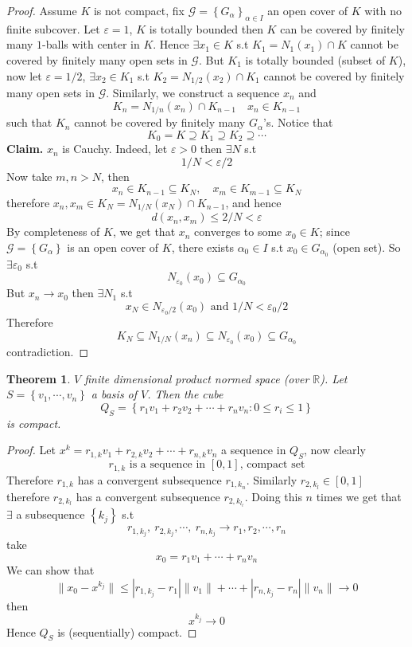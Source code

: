 \documentclass[11pt,a4paper]{article}
\theoremstyle{definition}
\theoremstyle{plain}
\newtheorem{theorem}[definition]{Theorem}
\theoremstyle{remark}
\newcommand{\R}{\mathbb{R}}
\renewcommand{\set}[1]{\left\{ #1 \right\}}
\newcommand{\norm}[1]{\lVert #1 \rVert}
\begin{document}
\begin{proof}
    Assume $K$ is not compact, fix $\mathcal{G} = \set{G_\alpha}_{\alpha \in I}$ an open cover of $K$ with no finite subcover. 
    Let $\varepsilon = 1$, $K$ is totally bounded then $K$ can be covered by finitely many $1$-balls with center in $K$. Hence $\exists x_1 \in K$ s.t 
    $K_1 = N_1 (x_1) \cap K$ cannot be covered by finitely many open sets in $\mathcal{G}$. But $K_1$ is totally bounded (subset of $K$), 
    now let $\varepsilon = 1/2$, $\exists x_2 \in K_1$ s.t $K_2 = N_{1/2} (x_2) \cap K_1$ cannot be covered by finitely many open sets in $\mathcal{G}$. 
    Similarly, we construct a sequence $x_n$ and 
    $$K_n = N_{1/n} (x_{n}) \cap K_{n-1} \quad x_n \in K_{n-1}$$
    such that $K_n$ cannot be covered by finitely many $G_\alpha$'s. Notice that 
    $$K_0 = K \supseteq K_1 \supseteq K_2 \supseteq \cdots$$
    \textbf{Claim.} $x_n$ is Cauchy. Indeed, let $\varepsilon > 0$ then $\exists N$ s.t 
    $$1/N < \varepsilon / 2$$
    Now take $m, n > N$, then 
    $$x_n \in K_{n-1} \subseteq K_N, \quad x_m \in K_{m-1} \subseteq K_N$$
    therefore $x_n, x_m \in K_N = N_{1/N} (x_N) \cap K_{n-1}$, and hence 
    $$d(x_n, x_m) \leq 2/N < \varepsilon$$
    By completeness of $K$, we get that $x_n$ converges to some $x_0 \in K$; since $\mathcal{G} = \set{G_\alpha}$ is an open cover of $K$, 
    there exists $\alpha_0 \in I$ s.t $x_0 \in G_{\alpha_0}$ (open set). So $\exists \varepsilon_0$ s.t 
    $$N_{\varepsilon_0} (x_0) \subseteq G_{\alpha_0}$$
    But $x_n \to x_0$ then $\exists N_1$ s.t 
    $$x_N \in N_{\varepsilon_0/2} (x_0) \text{ and } 1/N < \varepsilon_0 /2$$
    Therefore 
    $$K_N \subseteq N_{1/N} (x_n) \subseteq N_{\varepsilon_0} (x_0) \subseteq G_{\alpha_0}$$
    contradiction.
\end{proof}

\begin{theorem}
    $V$ finite dimensional product normed space (over $\R$). Let 
    $S = \set{v_1, \cdots, v_n}$ a basis of $V$. Then the cube 
    $$Q_S = \set{r_1 v_1 + r_2 v_2 + \cdots + r_n v_n \colon 0 \le r_i \le 1}$$
    is compact. 
\end{theorem}

\begin{proof}
    Let $x^k = r_{1,k} v_1 + r_{2,k} v_2 + \cdots + r_{n,k} v_n$ a sequence in $Q_S$, now clearly 
    $$r_{1,k} \text{ is a sequence in $[0,1]$, compact set}$$
    Therefore $r_{1,k}$ has a convergent subsequence $r_{1,k_n}$. Similarly $r_{2, k_l} \in [0,1]$ therefore 
    $r_{2,k_l}$ has a convergent subsequence $r_{2,k_{l_t}}$. Doing this $n$ times we get that $\exists$ a subsequence 
    $\set{k_j}$ s.t 
    $$r_{1,k_j}, \ r_{2,k_j}, \cdots, \ r_{n,k_j} \to r_1, r_2, \cdots, r_n$$ 
    take 
    $$x_0 = r_1 v_1 + \cdots + r_n v_n$$
    We can show that 
    $$\norm{x_0 - x^{k_j}} \le |r_{1,k_j} - r_1| \norm{v_1} + \cdots + |r_{n,k_j} - r_n| \norm{v_n} \to 0$$
    then 
    $$x^{k_j} \to 0$$ 
    Hence $Q_S$ is (sequentially) compact. 
\end{proof}
\end{document}

